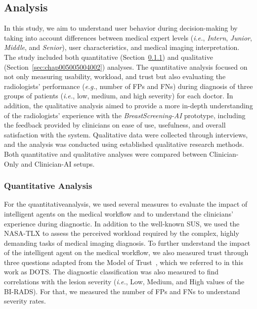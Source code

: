 \subsection{Analysis}
\label{sec:chap005005004}

In this study, we aim to understand user behavior during decision-making by taking into account differences between medical expert levels ({\it i.e.}, {\it Intern}, {\it Junior}, {\it Middle}, and {\it Senior}), user characteristics, and medical imaging interpretation.
The study included both quantitative (Section~\ref{sec:chap005005004001}) and qualitative (Section~\ref{sec:chap005005004002}) analyses.
The quantitative analysis focused on not only measuring usability, workload, and trust but also evaluating the radiologists' performance ({\it e.g.}, number of \acp{FP} and \acp{FN}) during diagnosis of three groups of patients ({\it i.e.}, low, medium, and high severity) for each doctor.
In addition, the qualitative analysis aimed to provide a more in-depth understanding of the radiologists' experience with the {\it BreastScreening-AI} prototype, including the feedback provided by clinicians on ease of use, usefulness, and overall satisfaction with the system.
Qualitative data were collected through interviews, and the analysis was conducted using established qualitative research methods.
Both quantitative and qualitative analyses were compared between Clinician-Only and Clinician-AI setups.

\subsubsection{Quantitative Analysis}
\label{sec:chap005005004001}

For the quantitative\footnotemark[13] analysis, we used several measures to evaluate the impact of intelligent agents on the medical workflow and to understand the clinicians' experience during diagnostic.
In addition to the well-known \ac{SUS}, we used the \ac{NASA-TLX} to assess the perceived workload required by the complex, highly demanding tasks of medical imaging diagnosis.
To further understand the impact of the intelligent agent on the medical workflow, we also measured trust through three questions adapted from the Model of Trust~\cite{CALISTO2021102607}, which we referred to in this work as \ac{DOTS}.
The diagnostic classification was also measured to find correlations with the lesion severity ({\it i.e.}, Low, Medium, and High values of the \acs{BI-RADS}).
For that, we measured the number of \acp{FP} and \acp{FN} to understand severity rates.


